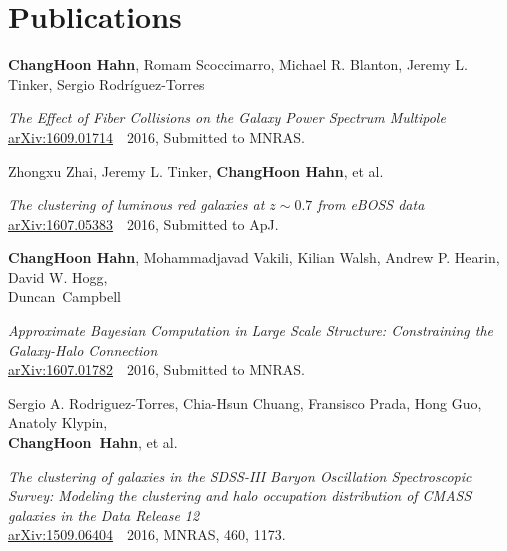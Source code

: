 \documentclass[10pt]{article} %
\begin{document}
\section{Publications} \vspace{-5pt}
{\bf ChangHoon Hahn}, Romam Scoccimarro, Michael R. Blanton, Jeremy L. Tinker, Sergio Rodr\'{i}guez-Torres\\
\begin{addmargin}[1em]{0em}
{\it The Effect of Fiber Collisions on the Galaxy Power Spectrum Multipole}\\
\href{http://arxiv.org/abs/1609.01714v1}{arXiv:1609.01714}~~2016, Submitted to MNRAS. \\[5pt]
\end{addmargin} 

Zhongxu Zhai, Jeremy L. Tinker, {\bf ChangHoon Hahn}, et al.\\
\begin{addmargin}[1em]{0em}
{\it The clustering of luminous red galaxies at $z \sim 0.7$ from eBOSS data}\\
\href{http://arxiv.org/abs/1607.05383v1}{arXiv:1607.05383}~~2016, Submitted to ApJ. \\[5pt]
\end{addmargin}

{\bf ChangHoon Hahn}, Mohammadjavad Vakili, Kilian Walsh, Andrew P. Hearin, David W. Hogg, \\ \mbox{Duncan Campbell}\\
\begin{addmargin}[1em]{0em}
{\it Approximate Bayesian Computation in Large Scale Structure: Constraining the Galaxy-Halo Connection} \\
\href{http://arxiv.org/abs/1607.01782}{arXiv:1607.01782}~~2016, Submitted to MNRAS. \\[5pt]
\end{addmargin}

Sergio A. Rodriguez-Torres, Chia-Hsun Chuang, Fransisco Prada, Hong Guo, Anatoly Klypin, \\ \mbox{\bf ChangHoon Hahn}, et al.\\
\begin{addmargin}[1em]{0em}
{\it The clustering of galaxies in the SDSS-III Baryon Oscillation Spectroscopic Survey: Modeling the clustering and halo occupation distribution of CMASS galaxies in the Data Release 12}\\
\href{http://arxiv.org/abs/1509.06404}{arXiv:1509.06404}~~2016, MNRAS, 460, 1173. \\[5pt]
\end{addmargin}
\end{document}
